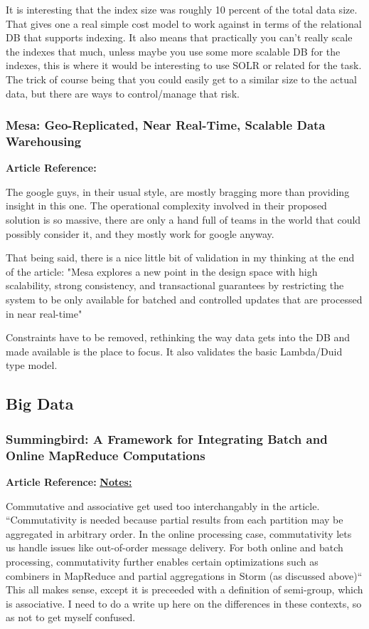 \documentclass{article}
\begin{document}
It is interesting that the index size was roughly 10 percent of the total data size. That gives one a real simple cost model to work against in terms of the relational DB that supports indexing. It also means that practically you can't really scale the indexes that much, unless maybe you use some more scalable DB for the indexes, this is where it would be interesting to use SOLR or related for the task. The trick of course being that you could easily get to a similar size to the actual data, but there are ways to control/manage that risk. 

\subsubsection{Mesa: Geo-Replicated, Near Real-Time, Scalable Data Warehousing}

\textbf{Article Reference:} \cite{42851}

The google guys, in their usual style, are mostly bragging more than providing insight in this one. The operational complexity involved in their proposed solution is so massive, there are only a hand full of teams in the world that could possibly consider it, and they mostly work for google anyway. 

That being said, there is a nice little bit of validation in my thinking at the end of the article: "Mesa explores a new point in the design space with high scalability, strong consistency, and transactional guarantees by restricting the system to be only available for batched and controlled updates that are processed in near real-time" 

Constraints have to be removed, rethinking the way data gets into the DB and made available is the place to focus. It also validates the basic Lambda/Duid type model.

\subsection{Big Data}

\subsubsection{Summingbird: A Framework for Integrating Batch and Online MapReduce Computations}

\textbf{Article Reference:} \href{http://www.vldb.org/pvldb/vol7/p1441-boykin.pdf}

\textbf{Notes:}

Commutative and associative get used too interchangably in the article. ``Commutativity is needed because partial results from each partition may be aggregated in arbitrary order. In the online processing case, commutativity lets us handle issues like out-of-order message delivery. For both online and batch processing, commutativity further enables certain optimizations such as combiners in MapReduce and partial aggregations in Storm (as discussed above)`` This all makes sense, except it is preceeded with a definition of semi-group, which is associative. I need to do a write up here on the differences in these contexts, so as not to get myself confused.
\end{document}
